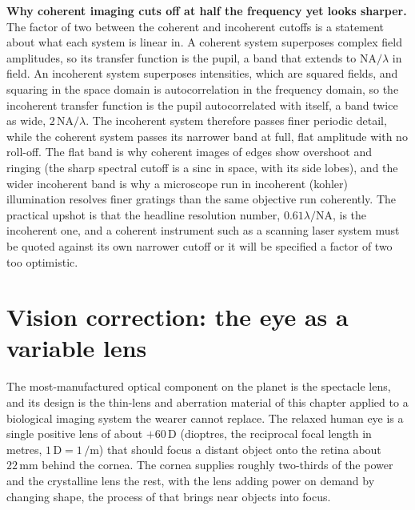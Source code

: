 \begin{mastery}
\textbf{Why coherent imaging cuts off at half the frequency yet looks sharper.}
The factor of two between the coherent and incoherent cutoffs is a statement
about what each system is linear in. A coherent system superposes complex field
amplitudes, so its transfer function is the pupil, a band that extends to
$\mathrm{NA}/\lambda$ in field. An incoherent system superposes intensities,
which are squared fields, and squaring in the space domain is autocorrelation in
the frequency domain, so the incoherent transfer function is the pupil
autocorrelated with itself, a band twice as wide, $2\,\mathrm{NA}/\lambda$. The
incoherent system therefore passes finer periodic detail, while the coherent
system passes its narrower band at full, flat amplitude with no roll-off. The
flat band is why coherent images of edges show overshoot and ringing (the sharp
spectral cutoff is a sinc in space, with its side lobes), and the wider
incoherent band is why a microscope run in incoherent (kohler) illumination
resolves finer gratings than the same objective run coherently. The practical
upshot is that the headline resolution number, $0.61\lambda/\mathrm{NA}$, is the
incoherent one, and a coherent instrument such as a scanning laser system must be
quoted against its own narrower cutoff or it will be specified a factor of two
too optimistic.
\end{mastery}

\section{Vision correction: the eye as a variable lens}

The most-manufactured optical component on the planet is the spectacle lens, and
its design is the thin-lens and aberration material of this chapter applied to a
biological imaging system the wearer cannot replace. The relaxed human eye is a
single positive lens of about $+60\,\text{D}$ (dioptres, the reciprocal focal
length in metres, $1\,\text{D} = 1\,\si{\per\meter}$) that should focus a distant
object onto the retina about $22\,\si{\milli\meter}$ behind the cornea. The
cornea supplies roughly two-thirds of the power and the crystalline lens the
rest, with the lens adding power on demand by changing shape, the process of
 that brings near objects into focus.

